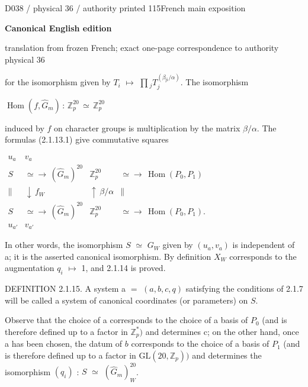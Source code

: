 \documentclass[9pt]{article}
\newcommand{\CanonText}[1]{\par{\fontsize{8.0}{9.35}\selectfont\RaggedRight #1\par}\vspace{2.2pt}}
\newcommand{\CanonDisplay}[1]{\par\vspace{1.2pt}\begin{center}{\fontsize{7.2}{8.4}\selectfont\(\displaystyle #1\)}\end{center}\vspace{1.2pt}}
\newenvironment{CanonMathBlock}{\par\vspace{1.2pt}\begin{center}\fontsize{6.8}{8.0}\selectfont\(\displaystyle}{\)\end{center}\vspace{1.2pt}}
\newcommand{\LayerTitle}{Canonical English edition}
\begin{document}
\noindent\begin{minipage}[t][\dimexpr\textheight-5pt\relax][t]{\textwidth}
{\sffamily\fontsize{7.3}{8.2}\selectfont\color{Quiet} D038 / physical 36 / authority printed 115\hfill French main exposition}
\par{}\vspace{4.5pt}
{\sffamily\fontsize{10.4}{11.6}\selectfont\bfseries\color{Accent} \LayerTitle}
\par{\sffamily\fontsize{6.7}{7.7}\selectfont\color{Quiet} translation from frozen French; exact one-page correspondence to authority physical 36}
\vspace{5pt}
\CanonText{for the isomorphism given by \(T_{i}\) \(\mapsto{}\) \(\prod{}_{j}T_{j}^{(\beta{}_{\mathrm{ji}}/\alpha{})}\). The isomorphism}
\CanonDisplay{\operatorname{Hom}(f,\widehat{G}_{m})\,:\,\mathbb{Z}_{p}^{20}\,\simeq{}\,\mathbb{Z}_{p}^{20}}
\CanonText{induced by \(f\) on character groups is multiplication by the matrix \(\beta{}/\alpha{}\). The formulas (2.1.13.1) give commutative squares}
\begin{CanonMathBlock}
\begin{array}{cccc}
u_{a} & v_{a} & {} & {}\\
S & \simeq{}\to{}\,(\widehat{G}_{m})^{20} & \mathbb{Z}_{p}^{20} & \simeq{}\to{}\,\operatorname{Hom}(P_{0},P_{1})\\
\parallel{} & \downarrow{}\,f_{W} & \uparrow{}\,\beta{}/\alpha{} & \parallel{}\\
S & \simeq{}\to{}\,(\widehat{G}_{m})^{20} & \mathbb{Z}_{p}^{20} & \simeq{}\to{}\,\operatorname{Hom}(P_{0},P_{1}).\\
u_{a'} & v_{a'} & {} & {}
\end{array}
\end{CanonMathBlock}
\CanonText{In other words, the isomorphism \(S\) \(\simeq{}\) \(G_{W}\) given by \((u_{a},v_{a})\) is independent of a; it is the asserted canonical isomorphism. By definition \(X_{W}\) corresponds to the augmentation \(q_{i}\) \(\mapsto{}\) 1, and 2.1.14 is proved.}
\CanonText{DEFINITION 2.1.15. A system a \(=\) \((a,b,c,q)\) satisfying the conditions of 2.1.7 will be called a system of canonical coordinates (or parameters) on \(S\).}
\CanonText{Observe that the choice of a corresponds to the choice of a basis of \(P_{0}\) (and is therefore defined up to a factor in \(\mathbb{Z}_{p}^{*})\) and determines c; on the other hand, once a has been chosen, the datum of \(b\) corresponds to the choice of a basis of \(P_{1}\) (and is therefore defined up to a factor in \(\mathrm{GL}(20,\mathbb{Z}_{p}))\) and determines the isomorphism \((q_{i})\) : \(S\) \(\simeq{}\) \((\widehat{G}_{m})_{W}^{20}\).}

\end{minipage}
\end{document}
